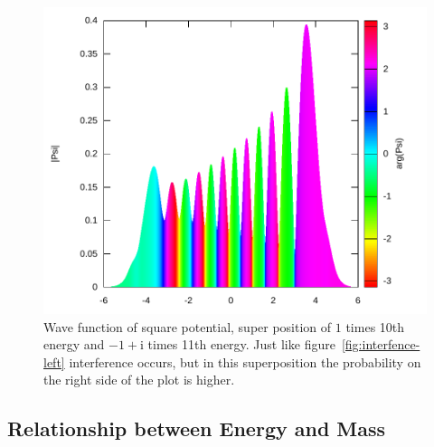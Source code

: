 \documentclass[11pt,DIV=10,final]{scrreprt} %
\newcommand{\mi}{{\text{i}}}
\begin{document}
{\begin{figure}[H]
\centering
\includegraphics[width=\textwidth]{plots/super-square-10_1-11_-1+i.pdf}
\caption{\label{fig:interference-right} Wave function of square potential, super position of $1$ times 10th energy and $-1+\mi$ times 11th energy. Just like figure~\ref{fig:interfence-left}
    interference occurs, but in this superposition the probability on the right side of the plot is higher.}
\end{figure}

\subsection{Relationship between Energy and Mass}

}
\end{document}
